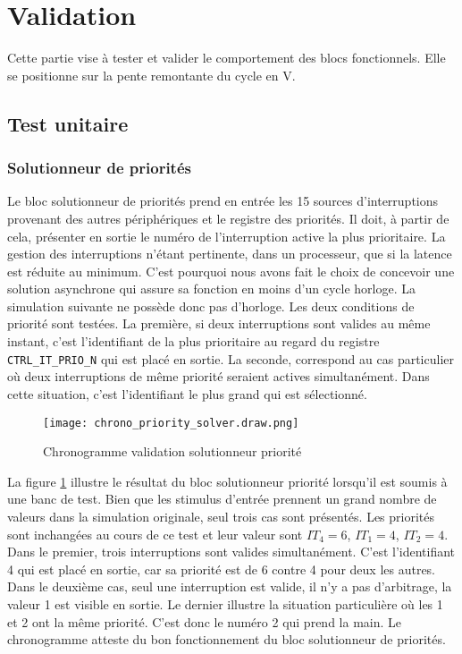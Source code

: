 \section{Validation}

Cette partie vise à tester et valider le comportement des blocs fonctionnels.
Elle se positionne sur la pente remontante du cycle en V.

\subsection{Test unitaire}

\subsubsection{Solutionneur de priorités}
Le bloc solutionneur de priorités prend en entrée les 15 sources d'interruptions provenant des autres périphériques et le registre des priorités.
Il doit, à partir de cela, présenter en sortie le numéro de l'interruption active la plus prioritaire.
La gestion des interruptions n'étant pertinente, dans un processeur, que si la latence est réduite au minimum.
C'est pourquoi nous avons fait le choix de concevoir une solution asynchrone qui assure sa fonction en moins d'un cycle horloge.
La simulation suivante ne possède donc pas d'horloge.
Les deux conditions de priorité sont testées.
La première, si deux interruptions sont valides au même instant, c'est l'identifiant de la plus prioritaire au regard du registre \texttt{CTRL\_IT\_PRIO\_N} qui est placé en sortie.
La seconde, correspond au cas particulier où deux interruptions de même priorité seraient actives simultanément.
Dans cette situation, c'est l'identifiant le plus grand qui est sélectionné.
\begin{figure}[H]
    \centering
    \texttt{[image: chrono\_priority\_solver.draw.png]}
    \caption{Chronogramme validation solutionneur priorité}
    \label{fig:chrono_prio_solv}
\end{figure}
La figure \ref{fig:chrono_prio_solv} illustre le résultat du bloc solutionneur priorité lorsqu'il est soumis à une banc de test.
Bien que les stimulus d'entrée prennent un grand nombre de valeurs dans la simulation originale, seul trois cas sont présentés.
Les priorités sont inchangées au cours de ce test et leur valeur sont $IT_4=6$, $IT_1=4$, $IT_2=4$.
Dans le premier, trois interruptions sont valides simultanément.
C'est l'identifiant 4 qui est placé en sortie, car sa priorité est de 6 contre 4 pour deux les autres.
Dans le deuxième cas, seul une interruption est valide, il n'y a pas d'arbitrage, la valeur 1 est visible en sortie.
Le dernier illustre la situation particulière où les 1 et 2 ont la même priorité.
C'est donc le numéro 2 qui prend la main.
Le chronogramme atteste du bon fonctionnement du bloc solutionneur de priorités.


